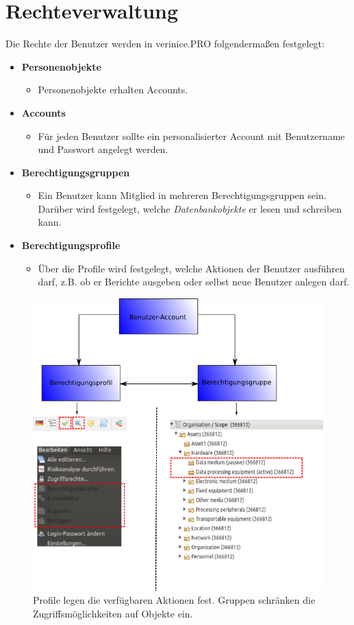 \documentclass[a4paper,10pt]{book}
\begin{document}
\section{Rechteverwaltung} \label{Rechteverwaltung}
Die Rechte der Benutzer werden in verinice.\textsc{PRO} folgendermaßen festgelegt:
\begin{itemize}
\item \textbf{Personenobjekte}
  \begin{itemize}
   \item Personenobjekte erhalten Accounts.
  \end{itemize}
\item \textbf{Accounts}
  \begin{itemize}
   \item Für jeden Benutzer sollte ein personalisierter Account mit Benutzername und Passwort angelegt werden.
  \end{itemize}
\item \textbf{Berechtigungsgruppen}
   \begin{itemize}
    \item Ein Benutzer kann Mitglied in mehreren Berechtigungsgruppen sein. Darüber wird festgelegt, welche \textit{Datenbankobjekte} er lesen und schreiben kann.
   \end{itemize}
\item \textbf{Berechtigungsprofile}
  \begin{itemize}
   \item Über die Profile wird festgelegt, welche Aktionen der Benutzer ausführen darf, z.B. ob er Berichte ausgeben oder selbst neue Benutzer anlegen darf.
  \end{itemize}
\end{itemize}
\begin{figure}[htb!]
  \centering
  \includegraphics[scale=.7]{Screenshot/Profile.png}
  \caption{\label{Profile_Aktionen_Gruppen_Zugriffsmoeglichkeiten_auf_Objekte} Profile legen die verfügbaren Aktionen fest. Gruppen schränken die Zugriffsmöglichkeiten auf Objekte ein.}
\end{figure}
\end{document}
